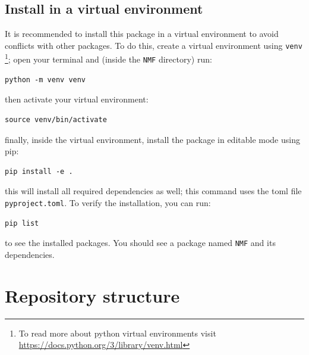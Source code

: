 \subsection{Install in a virtual environment}
It is recommended to install this package in a virtual environment to avoid conflicts with other packages. To do this, create a virtual environment using \texttt{venv} \footnote{To read more about python virtual environments visit \url{https://docs.python.org/3/library/venv.html}}; open your terminal and (inside the \texttt{NMF} directory) run:
\begin{lstlisting}
python -m venv venv
\end{lstlisting}
then activate your virtual environment:
\begin{lstlisting}
source venv/bin/activate
\end{lstlisting}
finally, inside the virtual environment, install the package in editable mode using pip:
\begin{lstlisting}
pip install -e .
\end{lstlisting}
this will install all required dependencies as well; this command uses the toml file \texttt{pyproject.toml}.
To verify the installation, you can run:
\begin{lstlisting}
pip list
\end{lstlisting}
to see the installed packages. You should see a package named \texttt{NMF} and its dependencies.
\newpage\section{Repository structure}\label{Repo structure section}
